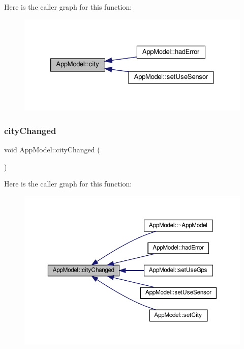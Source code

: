 Here is the caller graph for this function\+:
\nopagebreak
\begin{figure}[H]
\begin{center}
\leavevmode
\includegraphics[width=326pt]{class_app_model_a093066c81b5fe2c1361df8fd19a21f51_icgraph}
\end{center}
\end{figure}
\mbox{\label{class_app_model_aeb28c7a57316aaf6295a943a65f60569}} 
\subsubsection{\texorpdfstring{city\+Changed}{cityChanged}}
{\footnotesize\ttfamily void App\+Model\+::city\+Changed (\begin{DoxyParamCaption}{ }\end{DoxyParamCaption})\hspace{0.3cm}{\ttfamily [signal]}}

Here is the caller graph for this function\+:
\nopagebreak
\begin{figure}[H]
\begin{center}
\leavevmode
\includegraphics[width=350pt]{class_app_model_aeb28c7a57316aaf6295a943a65f60569_icgraph}
\end{center}
\end{figure}
\mbox{\label{class_app_model_aa9209b2390924841a009ab0d22b9a1b3}} 
